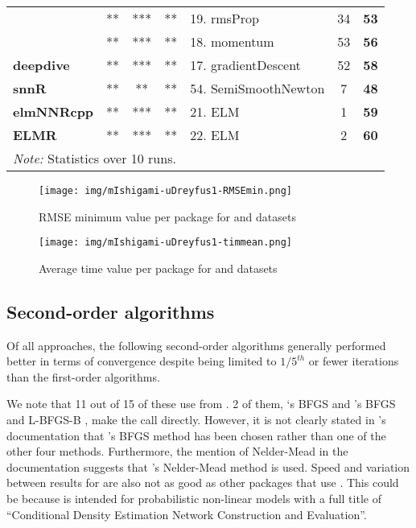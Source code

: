 \begin{Schunk}
\begin{table}
\begin{tabular}[t]{>{}lccclc>{}c}
 & ** & *** & ** & 19. rmsProp & 34 & \textbf{53}\\

 & ** & *** & ** & 18. momentum & 53 & \textbf{56}\\

\multirow{-4}{*}{\raggedright\arraybackslash \textbf{deepdive}} & ** & *** & ** & 17. gradientDescent & 52 & \textbf{58}\\
\cmidrule{1-7}
\textbf{snnR} & ** & ** & ** & 54. SemiSmoothNewton & 7 & \textbf{48}\\
\cmidrule{1-7}
\textbf{elmNNRcpp} & ** & *** & ** & 21. ELM & 1 & \textbf{59}\\
\cmidrule{1-7}
\textbf{ELMR} & ** & *** & ** & 22. ELM & 2 & \textbf{60}\\
\bottomrule
\multicolumn{7}{l}{\rule{0pt}{1em}\textit{Note: } Statistics over 10 runs.}\\
\end{tabular}
\end{table}

\end{Schunk}

\begin{figure}
  \centering
  \texttt{[image: img/mIshigami-uDreyfus1-RMSEmin.png]}
        \label{fig:Allpkg:RMSEmin}
        \caption{RMSE minimum value per package for 
        and  datasets}
\end{figure}

\begin{figure}
  \centering
  \texttt{[image: img/mIshigami-uDreyfus1-timmean.png]}
        \label{fig:Allpkg:timemean}
        \caption{Average time value per package for 
        and  datasets}
\end{figure}

\hypertarget{second-order-algorithms}{%
\subsection{Second-order algorithms}\label{second-order-algorithms}}

Of all approaches, the following second-order algorithms generally
performed better in terms of convergence despite being limited to
\(1/5^{th}\) or fewer iterations than the first-order algorithms.

We note that 11 out of 15 of these  use
 from . 2 of them, `s BFGS
\citep{R-CaDENCE} and 's BFGS and L-BFGS-B
\citep{R-validann}, make the call directly. However, it is not clearly
stated in 's documentation that 's BFGS method
has been chosen rather than one of the other four methods. Furthermore,
the mention of Nelder-Mead in the documentation suggests that
's Nelder-Mead method is used. Speed and variation between
results for  are also not as good as other packages that
use . This could be because  is intended for
probabilistic non-linear models with a full title of ``Conditional
Density Estimation Network Construction and Evaluation''.

